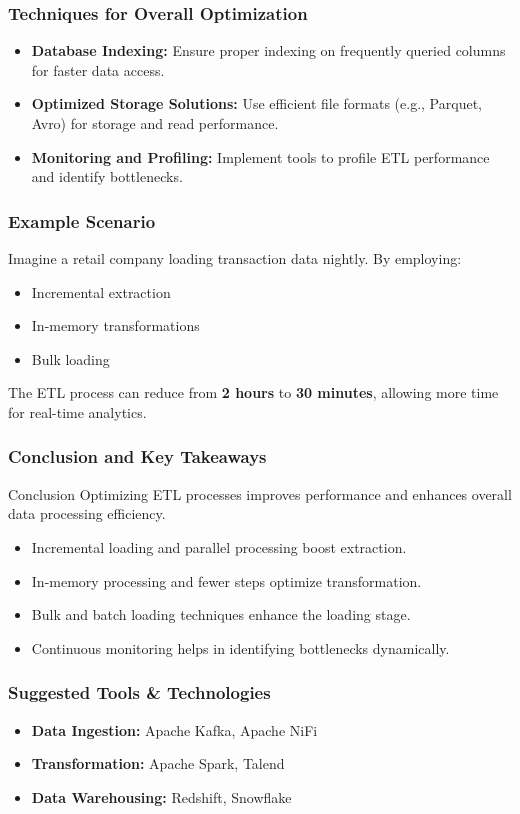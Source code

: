 \documentclass[aspectratio=169]{beamer}
\begin{document}
\begin{frame}[fragile]
    \frametitle{Techniques for Overall Optimization}
    \begin{itemize}
        \item \textbf{Database Indexing:} Ensure proper indexing on frequently queried columns for faster data access.
        \item \textbf{Optimized Storage Solutions:} Use efficient file formats (e.g., Parquet, Avro) for storage and read performance.
        \item \textbf{Monitoring and Profiling:} Implement tools to profile ETL performance and identify bottlenecks.
    \end{itemize}
\end{frame}

\begin{frame}[fragile]
    \frametitle{Example Scenario}
    Imagine a retail company loading transaction data nightly. By employing:
    \begin{itemize}
        \item Incremental extraction
        \item In-memory transformations
        \item Bulk loading
    \end{itemize}
    The ETL process can reduce from \textbf{2 hours} to \textbf{30 minutes}, allowing more time for real-time analytics.
\end{frame}

\begin{frame}[fragile]
    \frametitle{Conclusion and Key Takeaways}
    \begin{block}{Conclusion}
        Optimizing ETL processes improves performance and enhances overall data processing efficiency.
    \end{block}
    \begin{itemize}
        \item Incremental loading and parallel processing boost extraction.
        \item In-memory processing and fewer steps optimize transformation.
        \item Bulk and batch loading techniques enhance the loading stage.
        \item Continuous monitoring helps in identifying bottlenecks dynamically.
    \end{itemize}
\end{frame}

\begin{frame}[fragile]
    \frametitle{Suggested Tools \& Technologies}
    \begin{itemize}
        \item \textbf{Data Ingestion:} Apache Kafka, Apache NiFi
        \item \textbf{Transformation:} Apache Spark, Talend
        \item \textbf{Data Warehousing:} Redshift, Snowflake
    \end{itemize}
\end{frame}
\end{document}
